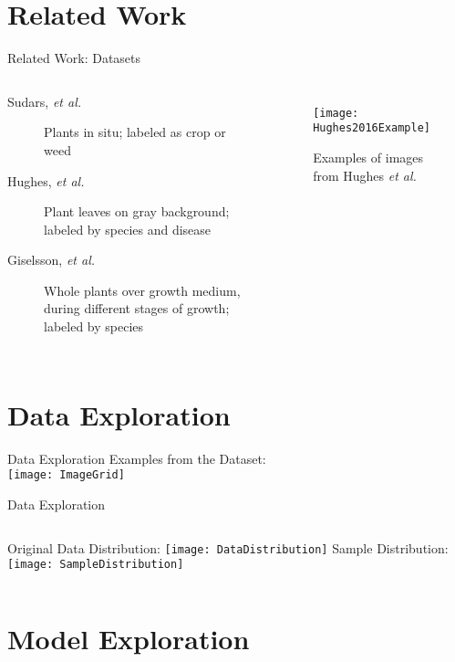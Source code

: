 \documentclass{beamer}
\begin{document}
\section[RW]{Related Work}

\begin{frame}{Related Work: Datasets}
	\begin{columns}
		\begin{description}
			\item[Sudars, \emph{et al.}] Plants in situ; labeled as crop or weed
			\item[Hughes, \emph{et al.}] Plant leaves on gray background; 
				labeled by species and disease
			\item[Giselsson, \emph{et al.}] Whole plants over growth medium, 
				during different stages of growth;
				labeled by species
		\end{description}
		\begin{figure}
			\begin{center}
				\texttt{[image: Hughes2016Example]}
			\end{center}
			\caption{Examples of images from Hughes \emph{et al.}}
		\end{figure}
	\end{columns}
\end{frame}

\section[Data]{Data Exploration}

\begin{frame}{Data Exploration}
	Examples from the Dataset: \\
	\centering
	\texttt{[image: ImageGrid]}
\end{frame}

\begin{frame}{Data Exploration}
	\begin{columns}
	\column{0.5\textwidth}
		Original Data Distribution:
		\texttt{[image: DataDistribution]}		
	\column{0.5\textwidth}
		Sample Distribution:
		\texttt{[image: SampleDistribution]}
	\end{columns}
\end{frame}

\section[Models]{Model Exploration}
\end{document}
